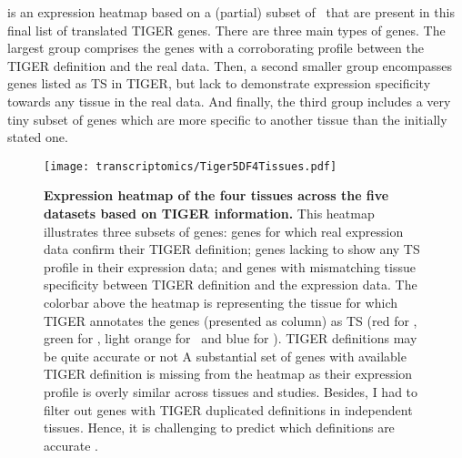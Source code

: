  is an expression heatmap based on
a (partial) subset of \pcgs\
that are present in this final list of translated \gls{TIGER} genes.
There are three main types of genes.
The largest group comprises the genes with a corroborating profile
between the \gls{TIGER} definition and the real data.
Then, a second smaller group encompasses genes
listed as \gls{TS} in \gls{TIGER},
but lack to demonstrate expression specificity
towards any tissue in the real data.
And finally, the third group includes a very tiny subset of genes which
are more specific to another tissue than the initially stated one.

\begin{figure}[!htpb]
    \texttt{[image: transcriptomics/Tiger5DF4Tissues.pdf]}\centering
    \caption[Expression heatmap of the four tissues across the five datasets based on
    TiGER]{\label{fig:TigerGenes}\textbf{Expression heatmap of the four tissues
    across the five datasets based on \gls{TIGER} information.}
    This heatmap illustrates three subsets of genes:
    genes for which real expression data confirm their \gls{TIGER} definition;
    genes lacking to show any \gls{TS} profile in their expression data; and
    genes with mismatching tissue specificity between \gls{TIGER}
    definition and the expression data.
    The colorbar above the heatmap is representing the tissue
    for which \gls{TIGER} annotates the genes (presented as column) as \gls{TS}
    (red for \Heart, green for \kidney, light orange for \liver\ and blue for \testis).
    \gls{TIGER} definitions may be quite accurate or not
    A substantial set of genes with available \gls{TIGER} definition is missing
    from the heatmap as their expression profile is overly similar across
    tissues and studies.
    Besides, I had to filter out genes with \gls{TIGER} duplicated definitions
    in independent tissues.
    Hence, it is challenging
    to predict which definitions are accurate .
    }
\end{figure}

